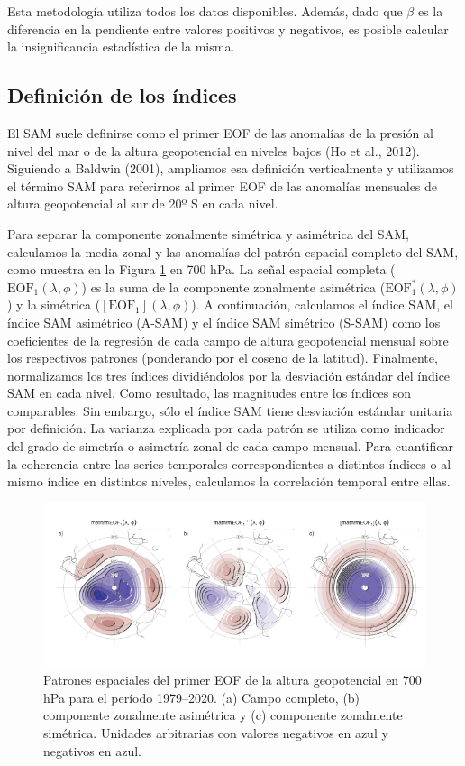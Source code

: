 \documentclass[12pt,oneside]{reedthesis}
\begin{document}
Esta metodología utiliza todos los datos disponibles.
Además, dado que \(\beta\) es la diferencia en la pendiente entre valores positivos y negativos, es posible calcular la insignificancia estadística de la misma.

\hypertarget{definition-of-indices}{%
\subsection{Definición de los índices}\label{definition-of-indices}}

El SAM suele definirse como el primer EOF de las anomalías de la presión al nivel del mar o de la altura geopotencial en niveles bajos (Ho et al., 2012).
Siguiendo a Baldwin (2001), ampliamos esa definición verticalmente y utilizamos el término SAM para referirnos al primer EOF de las anomalías mensuales de altura geopotencial al sur de 20º S en cada nivel.

Para separar la componente zonalmente simétrica y asimétrica del SAM, calculamos la media zonal y las anomalías del patrón espacial completo del SAM, como muestra en la Figura \ref{fig:method} en 700 hPa.
La señal espacial completa (\(\mathrm{EOF_1}(\lambda, \phi)\)) es la suma de la componente zonalmente asimétrica (\(\mathrm{EOF_1^*}(\lambda, \phi)\)) y la simétrica (\([\mathrm{EOF_1}](\lambda, \phi)\)).
A continuación, calculamos el índice SAM, el índice SAM asimétrico (A-SAM) y el índice SAM simétrico (S-SAM) como los coeficientes de la regresión de cada campo de altura geopotencial mensual sobre los respectivos patrones (ponderando por el coseno de la latitud).
Finalmente, normalizamos los tres índices dividiéndolos por la desviación estándar del índice SAM en cada nivel.
Como resultado, las magnitudes entre los índices son comparables.
Sin embargo, sólo el índice SAM tiene desviación estándar unitaria por definición.
La varianza explicada por cada patrón se utiliza como indicador del grado de simetría o asimetría zonal de cada campo mensual.
Para cuantificar la coherencia entre las series temporales correspondientes a distintos índices o al mismo índice en distintos niveles, calculamos la correlación temporal entre ellas.



\begin{figure}
\includegraphics{figures/30-sam/method-1} \caption{Patrones espaciales del primer EOF de la altura geopotencial en 700 hPa para el período 1979--2020. (a) Campo completo, (b) componente zonalmente asimétrica y (c) componente zonalmente simétrica. Unidades arbitrarias con valores negativos en azul y negativos en azul.}\label{fig:method}
\end{figure}
\end{document}
